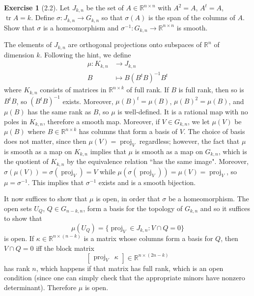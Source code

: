 \documentclass[10pt]{article}
\newcommand{\RR}{\mathbb{R}}
\DeclareMathOperator{\proj}{proj}
\DeclareMathOperator{\tr}{tr}
\theoremstyle{definition}
\newtheorem{exer}{Exercise}
\begin{document}
\begin{exer}[2.2]
Let $J_{k,n}$ be the set of $A \in \RR^{n \times n}$ with $A^2 = A$, $A^t = A$, $\tr A = k$.
Define $\sigma: J_{k,n} \to G_{k,n}$ so that $\sigma(A)$ is the span of the columns of $A$.
Show that $\sigma$ is a homeomorphism and $\sigma^{-1}: G_{k,n} \to \RR^{n \times n}$ is smooth.
\end{exer}

The elements of $J_{k,n}$ are orthogonal projections onto subspaces of $\RR^n$ of dimension $k$.
Following the hint, we define
\begin{align*}
\mu: K_{k,n} &\to J_{k,n}\\
B &\mapsto B(B^tB)^{-1}B^t
\end{align*}
where $K_{k,n}$ consists of matrices in $\RR^{n \times k}$ of full rank.
If $B$ is full rank, then so is $B^tB$, so $(B^tB)^{-1}$ exists.
Moreover, $\mu(B)^t = \mu(B)$, $\mu(B)^2 = \mu(B)$, and $\mu(B)$ has the same rank as $B$, so $\mu$ is well-defined.
It is a rational map with no poles in $K_{k,n}$, therefore a smooth map.
Moreover, if $V \in G_{k,n}$, we let $\mu(V)$ be $\mu(B)$ where $B \in \RR^{n \times k}$ has columns that form a basis of $V$.
The choice of basis does not matter, since then $\mu(V) = \proj_V$ regardless; however, the fact that $\mu$ is smooth as a map on $K_{k,n}$ implies that $\mu$ is smooth as a map on $G_{k,n}$, which is the quotient of $K_{k,n}$ by the equivalence relation ``has the same image".
Moreover, $\sigma(\mu(V)) = \sigma(\proj_V) = V$ while $\mu(\sigma(\proj_V)) = \mu(V) = \proj_V$, so $\mu = \sigma^{-1}$.
This implies that $\sigma^{-1}$ exists and is a smooth bijection.

It now suffices to show that $\mu$ is open, in order that $\sigma$ be a homeomorphism.
The open sets $U_Q$, $Q \in G_{n-k,n}$, form a basis for the topology of $G_{k,n}$ and so it suffices to show that
$$\mu(U_Q) = \{\proj_V \in J_{k,n}: V \cap Q = 0\}$$
is open. If $\kappa \in \RR^{n \times (n-k)}$ is a matrix whose columns form a basis for $Q$, then $V \cap Q = 0$ iff the block matrix
$$\begin{bmatrix}
\proj_V & \kappa
\end{bmatrix} \in \RR^{n \times (2n-k)}$$
has rank $n$, which happens if that matrix has full rank, which is an open condition (since one can simply check that the appropriate minors have nonzero determinant).
Therefore $\mu$ is open.
\end{document}
